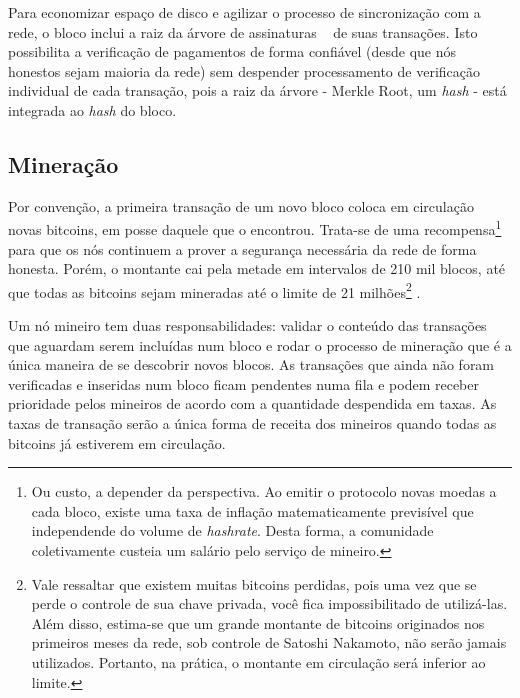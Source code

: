 \documentclass[a4paper,12pt]{monografia}
\theoremstyle{plain}
\theoremstyle{definition}
\theoremstyle{remark}
\begin{document}
Para economizar espa\c{c}o de disco e agilizar o processo de sincroniza\c{c}\~ao com a rede, o bloco inclui a raiz da \'arvore de assinaturas ~\cite{merkle} de suas transa\c{c}\~oes. Isto possibilita a verifica\c{c}\~ao de pagamentos de forma confi\'avel (desde que n\'os honestos sejam maioria da rede) sem despender processamento de verifica\c{c}\~ao individual de cada transa\c{c}\~ao, pois a raiz da \'arvore - Merkle Root, um \textit{hash} - est\'a integrada ao \textit{hash} do bloco.

\subsection{Minera\c{c}\~ao}

Por conven\c{c}\~ao, a primeira transa\c{c}\~ao de um novo bloco coloca em circula\c{c}\~ao novas bitcoins, em posse daquele que o encontrou.
Trata-se de uma recompensa\footnote{Ou custo, a depender da perspectiva. Ao emitir o protocolo novas moedas a cada bloco, existe uma taxa de infla\c{c}\~ao matematicamente previs\'ivel que independende do volume de \textit{hashrate}. Desta forma, a comunidade coletivamente custeia um sal\'ario pelo servi\c{c}o de mineiro.} para que os n\'os continuem a prover a seguran\c{c}a necess\'aria da rede de forma honesta.
Por\'em, o montante cai pela metade em intervalos de 210 mil blocos, at\'e que todas as bitcoins sejam mineradas at\'e o limite de 21 milh\~oes\footnote{Vale ressaltar que existem muitas bitcoins perdidas, pois uma vez que se perde o controle de sua chave privada, voc\^e fica impossibilitado de utiliz\'a-las.
Al\'em disso, estima-se que um grande montante de bitcoins originados nos primeiros meses da rede, sob controle de Satoshi Nakamoto, n\~ao ser\~ao jamais utilizados.
Portanto, na pr\'atica, o montante em circula\c{c}\~ao ser\'a inferior ao limite.} \cite{bitcoin}.

Um n\'o mineiro tem duas responsabilidades: validar o conte\'udo das transa\c{c}\~oes que aguardam serem inclu\'idas num bloco e rodar o processo de minera\c{c}\~ao que \'e a \'unica maneira de se descobrir novos blocos.
As transa\c{c}\~oes que ainda n\~ao foram verificadas e inseridas num bloco ficam pendentes numa fila e podem receber prioridade pelos mineiros de acordo com a quantidade despendida em taxas.
As taxas de transa\c{c}\~ao ser\~ao a \'unica forma de receita dos mineiros quando todas as bitcoins j\'a estiverem em circula\c{c}\~ao.
\end{document}
